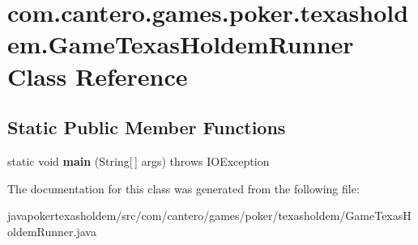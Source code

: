 \hypertarget{classcom_1_1cantero_1_1games_1_1poker_1_1texasholdem_1_1_game_texas_holdem_runner}{}\section{com.\+cantero.\+games.\+poker.\+texasholdem.\+Game\+Texas\+Holdem\+Runner Class Reference}
\label{classcom_1_1cantero_1_1games_1_1poker_1_1texasholdem_1_1_game_texas_holdem_runner}
\subsection*{Static Public Member Functions}
\begin{DoxyCompactItemize}
\item 
\hypertarget{classcom_1_1cantero_1_1games_1_1poker_1_1texasholdem_1_1_game_texas_holdem_runner_aa9e648945d7e5e961b10b2c4ee7cb785}{}static void {\bfseries main} (String\mbox{[}$\,$\mbox{]} args)  throws I\+O\+Exception \label{classcom_1_1cantero_1_1games_1_1poker_1_1texasholdem_1_1_game_texas_holdem_runner_aa9e648945d7e5e961b10b2c4ee7cb785}

\end{DoxyCompactItemize}


The documentation for this class was generated from the following file\+:\begin{DoxyCompactItemize}
\item 
javapokertexasholdem/src/com/cantero/games/poker/texasholdem/Game\+Texas\+Holdem\+Runner.\+java\end{DoxyCompactItemize}
